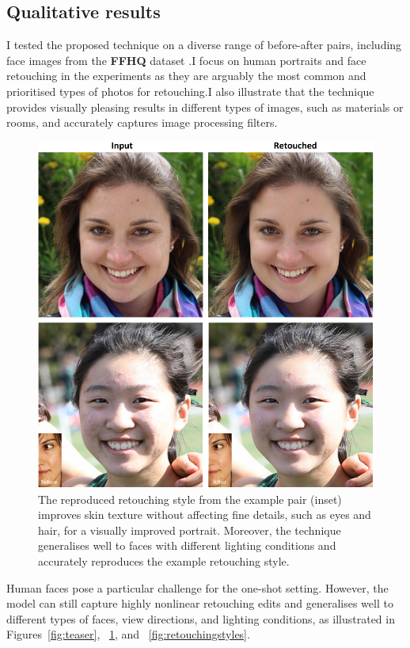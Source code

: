 \subsection{Qualitative results}
I tested the proposed technique on a diverse range of before-after pairs, including face images from the \textbf{FFHQ} dataset \cite{karras2019style}.I focus on human portraits and face retouching in the experiments as they are arguably the most common and prioritised types of photos for retouching.I also illustrate that the technique provides visually pleasing results in different types of images, such as materials or rooms, and accurately captures image processing filters.

\begin{figure}[th] %
    \centering
	\includegraphics[width=0.8\columnwidth]{Chapters/detail-retouching-figs/res_diff_light_2_cvmp.pdf}
    \caption{\label{fig:newdataset_ex}The reproduced retouching style from the example pair (inset) improves skin texture without affecting fine details, such as eyes and hair, for a visually improved portrait. Moreover, the technique generalises well to faces with different lighting conditions and accurately reproduces the example retouching style.}
 
\end{figure}
Human faces pose a particular challenge for the one-shot setting. However, the model can still capture highly nonlinear retouching edits and generalises well to different types of faces, view directions, and lighting conditions, as illustrated in Figures~\ref{fig:teaser}, ~\ref{fig:newdataset_ex}, and ~\ref{fig:retouchingstyles}.

